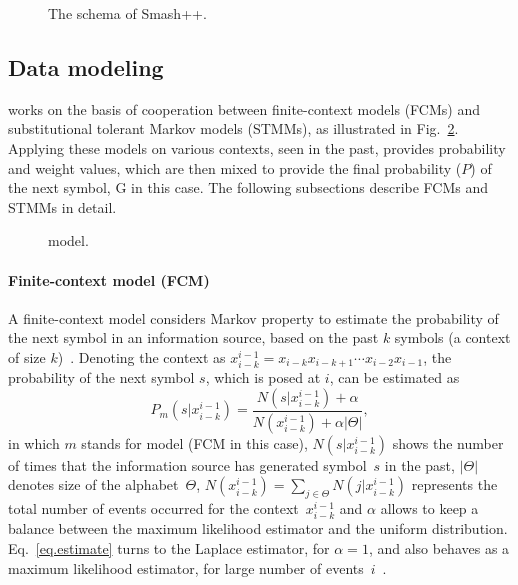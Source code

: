 \begin{figure}[!h]
\caption{The schema of Smash++.}
\label{fig.schema}
\end{figure}

\subsection{Data modeling}
\smashpp works on the basis of cooperation between finite-context models (FCMs) and substitutional tolerant Markov models (STMMs), as illustrated in Fig.~\ref{fig.model}. Applying these models on various contexts, seen in the past, provides probability and weight values, which are then mixed to provide the final probability ($P$) of the next symbol, G in this case. The following subsections describe FCMs and STMMs in detail.

\begin{figure}[!h]
  \centering
\caption{model.}
\label{fig.model}
\end{figure}

\paragraph{Finite-context model (FCM)}
A finite-context model considers Markov property to estimate the probability of the next symbol in an information source, based on the past $k$ symbols (a context of size $k$)~\cite{sayood2017introduction,hosseini2019ac,pinho2013mfcompress}. Denoting the context as $x_{i-k}^{i-1} = x_{i-k} x_{i-k+1}\cdots x_{i-2} x_{i-1}$, the probability of the next symbol $s$, which is posed at $i$, can be estimated as
\begin{equation} \label{eq.estimate}
P_m(s|x_{i-k}^{i-1}) = \frac{N(s|x_{i-k}^{i-1})+\alpha}{N(x_{i-k}^{i-1})+ \alpha|\Theta|},
\end{equation}
in which $m$ stands for model (FCM in this case), $N(s|x_{i-k}^{i-1})$ shows the number of times that the information source has generated symbol~$s$ in the past, $|\Theta|$ denotes size of the alphabet~$\Theta$, $N(x_{i-k}^{i-1}) = \sum_{j \in \Theta} N(j|x_{i-k}^{i-1})$ represents the total number of events occurred for the context~$x_{i-k}^{i-1}$ and $\alpha$ allows to keep a balance between the maximum likelihood estimator and the uniform distribution. Eq.~\ref{eq.estimate} turns to the Laplace estimator, for $\alpha=1$, and also behaves as a maximum likelihood estimator, for large number of events~$i$~\cite{pratas2015alignment}.

